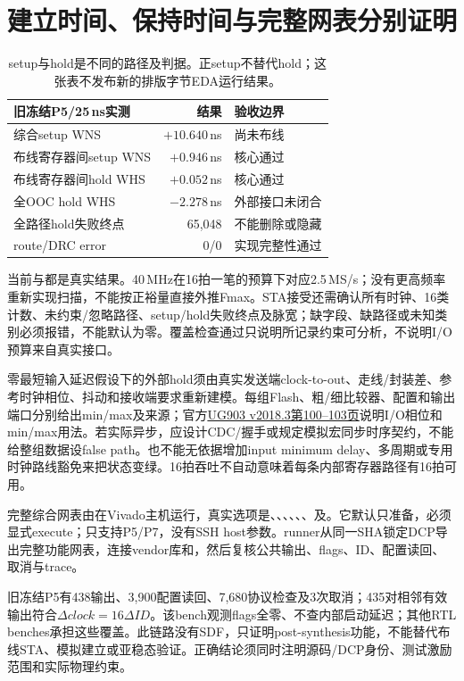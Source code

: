 \section{建立时间、保持时间与完整网表分别证明}
\begin{table}[H]\centering\small
\begin{tabular}{p{58mm}rl}\toprule
旧冻结P5/25\,ns实测&结果&验收边界\\\midrule
综合setup WNS&$+10.640$\,ns&尚未布线\\
布线寄存器间setup WNS&$+0.946$\,ns&核心通过\\
布线寄存器间hold WHS&$+0.052$\,ns&核心通过\\
全OOC hold WHS&$-2.278$\,ns&外部接口未闭合\\
全路径hold失败终点&65,048&不能删除或隐藏\\
route/DRC error&0/0&实现完整性通过\\
\bottomrule\end{tabular}
\caption{setup与hold是不同的路径及判据。正setup不替代hold；这张表不发布新的排版字节EDA运行结果。}
\end{table}

当前与都是真实结果。40\,MHz在16拍一笔的预算下对应2.5\,MS/s；没有更高频率重新实现扫描，不能按正裕量直接外推Fmax。STA接受还需确认所有时钟、16类计数、未约束/忽略路径、setup/hold失败终点及脉宽；缺字段、缺路径或未知类别必须报错，不能默认为零。覆盖检查通过只说明所记录约束可分析，不说明I/O预算来自真实接口。

零最短输入延迟假设下的外部hold须由真实发送端clock-to-out、走线/封装差、参考时钟相位、抖动和接收端要求重新建模。每组Flash、粗/细比较器、配置和输出端口分别给出min/max及来源；官方\href{https://docs.amd.com/v/u/2018.3-English/ug903-vivado-using-constraints}{UG903 v2018.3第100--103页}说明I/O相位和min/max用法。若实际异步，应设计CDC/握手或规定模拟宏同步时序契约，不能给整组数据设false path。也不能无依据增加input minimum delay、多周期或专用时钟路线豁免来把状态变绿。16拍吞吐不自动意味着每条内部寄存器路径有16拍可用。

完整综合网表由在Vivado主机运行，真实选项是、、、、、、及。它默认只准备，必须显式execute；只支持P5/P7，没有SSH host参数。runner从同一SHA锁定DCP导出完整功能网表，连接vendor库和，然后复核公共输出、flags、ID、配置读回、取消与trace。

旧冻结P5有438输出、3,900配置读回、7,680协议检查及3次取消；435对相邻有效输出符合\(\Delta clock=16\Delta ID\)。该bench观测flags全零、不查内部启动延迟；其他RTL benches承担这些覆盖。此链路没有SDF，只证明post-synthesis功能，不能替代布线STA、模拟建立或亚稳态验证。正确结论须同时注明源码/DCP身份、测试激励范围和实际物理约束。

